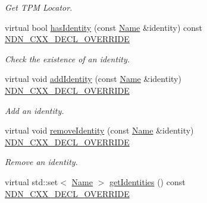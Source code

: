 \begin{DoxyCompactItemize}
\begin{DoxyCompactList}\small\item\em Get T\+PM Locator. \end{DoxyCompactList}\item 
virtual bool \hyperlink{classndn_1_1security_1_1PibMemory_a71a8687a58cc8abae3a616e5f9d06b0a}{has\+Identity} (const \hyperlink{classndn_1_1Name}{Name} \&identity) const \hyperlink{ndn-cxx_2src_2common_8hpp_a901daa44edd42d3f44df61d77277d57f}{N\+D\+N\+\_\+\+C\+X\+X\+\_\+\+D\+E\+C\+L\+\_\+\+O\+V\+E\+R\+R\+I\+DE}
\begin{DoxyCompactList}\small\item\em Check the existence of an identity. \end{DoxyCompactList}\item 
virtual void \hyperlink{classndn_1_1security_1_1PibMemory_ada4200e8fd9bb4a46f4538f7c467e798}{add\+Identity} (const \hyperlink{classndn_1_1Name}{Name} \&identity) \hyperlink{ndn-cxx_2src_2common_8hpp_a901daa44edd42d3f44df61d77277d57f}{N\+D\+N\+\_\+\+C\+X\+X\+\_\+\+D\+E\+C\+L\+\_\+\+O\+V\+E\+R\+R\+I\+DE}
\begin{DoxyCompactList}\small\item\em Add an identity. \end{DoxyCompactList}\item 
virtual void \hyperlink{classndn_1_1security_1_1PibMemory_af56d5d5ab3f2dffe849afbf07d81f02a}{remove\+Identity} (const \hyperlink{classndn_1_1Name}{Name} \&identity) \hyperlink{ndn-cxx_2src_2common_8hpp_a901daa44edd42d3f44df61d77277d57f}{N\+D\+N\+\_\+\+C\+X\+X\+\_\+\+D\+E\+C\+L\+\_\+\+O\+V\+E\+R\+R\+I\+DE}
\begin{DoxyCompactList}\small\item\em Remove an identity. \end{DoxyCompactList}\item 
virtual std\+::set$<$ \hyperlink{classndn_1_1Name}{Name} $>$ \hyperlink{classndn_1_1security_1_1PibMemory_a83da1a3f66bfabaf81623acecfba66e3}{get\+Identities} () const \hyperlink{ndn-cxx_2src_2common_8hpp_a901daa44edd42d3f44df61d77277d57f}{N\+D\+N\+\_\+\+C\+X\+X\+\_\+\+D\+E\+C\+L\+\_\+\+O\+V\+E\+R\+R\+I\+DE}\hypertarget{classndn_1_1security_1_1PibMemory_a83da1a3f66bfabaf81623acecfba66e3}{}\label{classndn_1_1security_1_1PibMemory_a83da1a3f66bfabaf81623acecfba66e3}


\end{DoxyCompactItemize}
